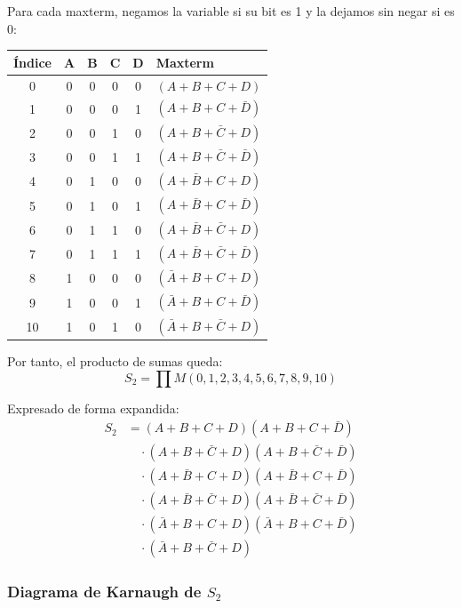 \documentclass[11pt,a4paper]{article}
\begin{document}
Para cada maxterm, negamos la variable si su bit es 1 y la dejamos sin negar si es 0:

\begin{center}
\begin{tabular}{|c|c|c|c|c|l|}
\hline
\textbf{Índice} & A & B & C & D & \textbf{Maxterm} \\
\hline
0  & 0 & 0 & 0 & 0 & $(A + B + C + D)$ \\
1  & 0 & 0 & 0 & 1 & $(A + B + C + \bar{D})$ \\
2  & 0 & 0 & 1 & 0 & $(A + B + \bar{C} + D)$ \\
3  & 0 & 0 & 1 & 1 & $(A + B + \bar{C} + \bar{D})$ \\
4  & 0 & 1 & 0 & 0 & $(A + \bar{B} + C + D)$ \\
5  & 0 & 1 & 0 & 1 & $(A + \bar{B} + C + \bar{D})$ \\
6  & 0 & 1 & 1 & 0 & $(A + \bar{B} + \bar{C} + D)$ \\
7  & 0 & 1 & 1 & 1 & $(A + \bar{B} + \bar{C} + \bar{D})$ \\
8  & 1 & 0 & 0 & 0 & $(\bar{A} + B + C + D)$ \\
9  & 1 & 0 & 0 & 1 & $(\bar{A} + B + C + \bar{D})$ \\
10 & 1 & 0 & 1 & 0 & $(\bar{A} + B + \bar{C} + D)$ \\
\hline
\end{tabular}
\end{center}

Por tanto, el producto de sumas queda:
\[S_2 = \prod M(0,1,2,3,4,5,6,7,8,9,10)\]

Expresado de forma expandida:
\begin{align*}
S_2 &= (A + B + C + D)(A + B + C + \bar{D}) \\
&\quad \cdot (A + B + \bar{C} + D)(A + B + \bar{C} + \bar{D}) \\
&\quad \cdot (A + \bar{B} + C + D)(A + \bar{B} + C + \bar{D}) \\
&\quad \cdot (A + \bar{B} + \bar{C} + D)(A + \bar{B} + \bar{C} + \bar{D}) \\
&\quad \cdot (\bar{A} + B + C + D)(\bar{A} + B + C + \bar{D}) \\
&\quad \cdot (\bar{A} + B + \bar{C} + D)
\end{align*}

\subsubsection*{Diagrama de Karnaugh de $S_2$}
\end{document}

